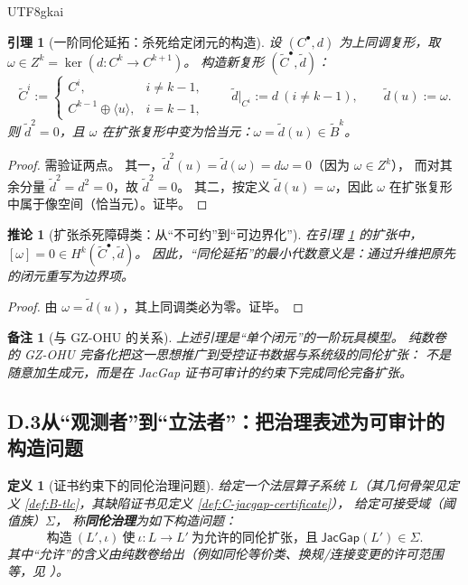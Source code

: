 \documentclass[12pt]{article}
\newtheorem{definition}{定义}[section]
\newtheorem{corollary}{推论}[section]
\newtheorem{lemma}{引理}[section]
\newtheorem{remark}{备注}[section]
\begin{document}
\begin{CJK*}{UTF8}{gkai}
\begin{lemma}[一阶同伦延拓：杀死给定闭元的构造]\label{lem:D-kill-cocycle-by-extension}
设 $(C^\bullet,d)$ 为上同调复形，取 $\omega\in Z^k=\ker(d:C^k\to C^{k+1})$。
构造新复形 $(\widetilde{C}^\bullet,\widetilde{d})$：
\[
  \widetilde{C}^i :=
  \begin{cases}
    C^i, & i\neq k-1,\\
    C^{k-1}\oplus \langle u\rangle, & i=k-1,
  \end{cases}
  \qquad
  \widetilde{d}|_{C^{i}}:=d\ (i\neq k-1),
  \qquad
  \widetilde{d}(u):=\omega.
\]
则 $\widetilde{d}^2=0$，且 $\omega$ 在扩张复形中变为恰当元：$\omega=\widetilde{d}(u)\in \widetilde{B}^k$。
\end{lemma}

\begin{proof}
需验证两点。
其一，$\widetilde{d}^2(u)=\widetilde{d}(\omega)=d\omega=0$（因为 $\omega\in Z^k$），
而对其余分量 $\widetilde{d}^2=d^2=0$，故 $\widetilde{d}^2=0$。
其二，按定义 $\widetilde{d}(u)=\omega$，因此 $\omega$ 在扩张复形中属于像空间（恰当元）。证毕。
\end{proof}

\begin{corollary}[扩张杀死障碍类：从“不可约”到“可边界化”]\label{cor:D-extension-kills-class}
在引理 \ref{lem:D-kill-cocycle-by-extension} 的扩张中，$[\omega]=0\in H^k(\widetilde{C}^\bullet,\widetilde{d})$。
因此，“同伦延拓”的最小代数意义是：通过升维把原先的闭元重写为边界项。
\end{corollary}
\begin{proof}
由 $\omega=\widetilde{d}(u)$，其上同调类必为零。证毕。
\end{proof}

\begin{remark}[与 GZ-OHU 的关系]\label{rem:D-ohu-relation}
上述引理是“单个闭元”的一阶玩具模型。
纯数卷 \cite{GaoZheng2025GFramework} 的 GZ-OHU 完备化把这一思想推广到\emph{受控证书数据}与\emph{系统级}的同伦扩张：
不是随意加生成元，而是在 JacGap 证书可审计的约束下完成同伦完备扩张。
\end{remark}

\subsection{D.3\;从“观测者”到“立法者”：把治理表述为可审计的构造问题}

\begin{definition}[证书约束下的同伦治理问题]\label{def:D-governance-problem}
给定一个法层算子系统 $L$（其几何骨架见定义 \ref{def:B-tlc}，其缺陷证书见定义 \ref{def:C-jacgap-certificate}），
给定可接受域（阈值族）$\Sigma$，
称\textbf{同伦治理}为如下构造问题：
\[
  \text{构造}\ (L',\iota)\ \text{使}\ \iota:L\to L'\ \text{为允许的同伦扩张，且}\ \mathsf{JacGap}(L')\in \Sigma.
\]
其中“允许”的含义由纯数卷给出（例如同伦等价类、换规/连接变更的许可范围等，见 \cite{GaoZheng2025GFramework}）。
\end{definition}


\end{CJK*}
\end{document}
